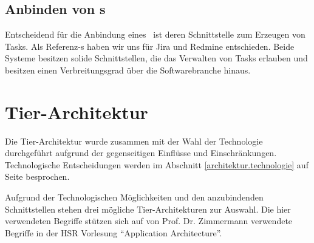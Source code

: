 		
		\subsection{Anbinden von \ppt s}
			Entscheidend für die Anbindung eines \ppt\ ist deren Schnittstelle zum Erzeugen von Tasks. 
			Als Referenz-\ppt s haben wir uns für Jira und Redmine entschieden.
			Beide Systeme besitzen solide Schnittstellen,
			die das Verwalten von Tasks erlauben 
			und besitzen einen Verbreitungsgrad über die Softwarebranche hinaus.
		

	\section{Tier-Architektur}
		Die Tier-Architektur wurde zusammen mit der Wahl der Technologie durchgeführt aufgrund der gegenseitigen Einflüsse und Einschränkungen.
		Technologische Entscheidungen werden im Abschnitt \ref{architektur.technologie} auf 
Seite \pageref{architektur.technologie} besprochen.
		
		Aufgrund der Technologischen Möglichkeiten und den anzubindenden Schnittstellen stehen drei mögliche Tier-Architekturen zur Auswahl.
		Die hier verwendeten Begriffe stützen sich auf von Prof. Dr. Zimmermann verwendete Begriffe in der HSR Vorlesung "`Application Architecture"'\cite{prof._dr._zimmerman_layers_2014}.		
		
